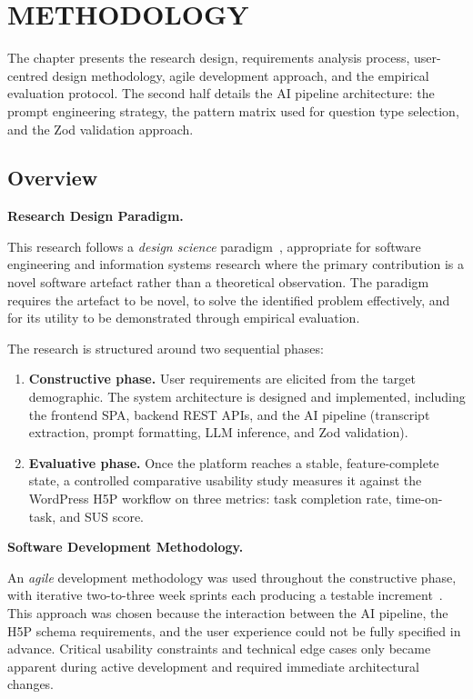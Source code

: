 \chapter{METHODOLOGY}
\label{ch:methodology}

The chapter presents the research design, requirements analysis process, user-centred design methodology, agile development approach, and the empirical evaluation protocol. The second half details the AI pipeline architecture: the prompt engineering strategy, the pattern matrix used for question type selection, and the Zod validation approach.

\section{Overview}

\textbf{Research Design Paradigm.}

This research follows a \emph{design science} paradigm~\cite{sommerville2016}, appropriate for software engineering and information systems research where the primary contribution is a novel software artefact rather than a theoretical observation. The paradigm requires the artefact to be novel, to solve the identified problem effectively, and for its utility to be demonstrated through empirical evaluation.

The research is structured around two sequential phases:

\begin{enumerate}
  \item \textbf{Constructive phase.} User requirements are elicited from the target demographic. The system architecture is designed and implemented, including the frontend SPA, backend REST APIs, and the AI pipeline (transcript extraction, prompt formatting, LLM inference, and Zod validation).

  \item \textbf{Evaluative phase.} Once the platform reaches a stable, feature-complete state, a controlled comparative usability study measures it against the WordPress H5P workflow on three metrics: task completion rate, time-on-task, and SUS score.
\end{enumerate}
\clearpage
\textbf{Software Development Methodology.}

An \emph{agile} development methodology was used throughout the constructive phase, with iterative two-to-three week sprints each producing a testable increment~\cite{beck2001}. This approach was chosen because the interaction between the AI pipeline, the H5P schema requirements, and the user experience could not be fully specified in advance. Critical usability constraints and technical edge cases only became apparent during active development and required immediate architectural changes.

